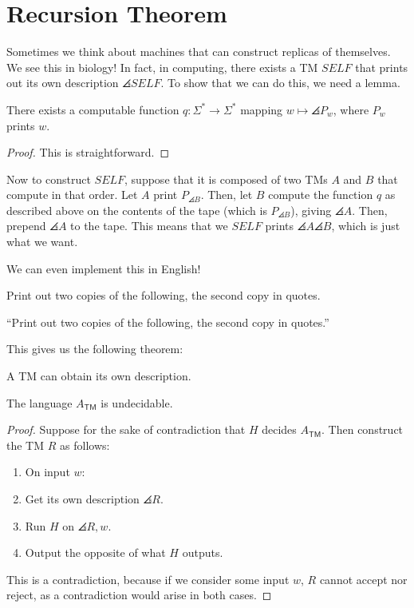 \documentclass{standalone}
\begin{document}
\section{Recursion Theorem}
Sometimes we think about machines that can construct replicas of themselves. We see this in biology! In fact, in computing, there exists a \textsf{TM} \(\mathit{SELF}\) that prints out its own description \(\angles{\textit{SELF}}\).  To show that we can do this, we need a lemma.

\begin{lemma}
  There exists a computable function \(q \colon \Sigma^* \to \Sigma^*\) mapping \(w \mapsto \angles{P_w}\), where \(P_w\) prints \(w\).
\end{lemma}
\begin{proof}
  This is straightforward.
\end{proof}

Now to construct \(\mathit{SELF}\), suppose that it is composed of two \textsf{TM}s \(A\) and \(B\) that compute in that order. Let \(A\) print \(P_{\angles B}\). Then, let \(B\) compute the function \(q\) as described above on the contents of the tape (which is \(P_{\angles B}\)), giving \(\angles A\). Then, prepend \(\angles A\) to the tape. This means that we \(\mathit{SELF}\) prints \(\angles A \angles B\), which is just what we want.

We can even implement this in English!
\begin{algorithm*}
  Print out two copies of the following, the second copy in quotes.

  ``Print out two copies of the following, the second copy in quotes.''
\end{algorithm*}

This gives us the following theorem:
\begin{theorem}
  A \textsf{TM} can obtain its own description.
\end{theorem}

\begin{corollary}
  The language \(A_{\textsf{TM}}\) is undecidable.
\end{corollary}
\begin{proof}
  Suppose for the sake of contradiction that \(H\) decides \(A_{\textsf{TM}}\). Then construct the \textsf{TM} \(R\) as follows:
  \begin{enumerate}[start=0]
    \item On input \(w\):
    \item Get its own description \(\angles{R}\).
    \item Run \(H\) on \(\angles{R, w}\).
    \item Output the opposite of what \(H\) outputs.
  \end{enumerate}
  
  This is a contradiction, because if we consider some input \(w\), \(R\) cannot accept nor reject, as a contradiction would arise in both cases.
\end{proof}
\end{document}
